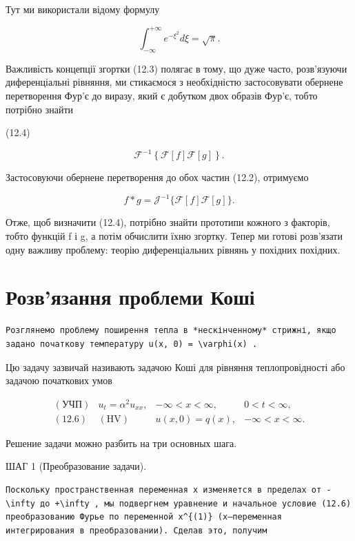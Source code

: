 \documentclass[
  ukrainian,
]{article}
\begin{document}
Тут ми використали відому формулу

\[
\int_{-\infty}^{+\infty} e^{-\xi^2} d\xi = \sqrt{\pi}.
\]

Важливість концепції згортки (12.3) полягає в тому, що дуже часто,
розв'язуючи диференціальні рівняння, ми стикаємося з необхідністю
застосовувати обернене перетворення Фур'є до виразу, який є добутком
двох образів Фур'є, тобто потрібно знайти

(12.4)

\[
\mathcal{F}^{-1}\left\{\mathcal{F}\left[f\right]\mathcal{F}\left[g\right]\right\}.
\]

Застосовуючи обернене перетворення до обох частин (12.2), отримуємо

\[
f * g = \mathcal{J}^{-1} \{ \mathcal{F} [f] \mathcal{F} [g] \}.
\]

Отже, щоб визначити (12.4), потрібно знайти прототипи кожного з
факторів, тобто функцій f і g, а потім обчислити їхню згортку. Тепер ми
готові розв'язати одну важливу проблему: теорію диференціальних рівнянь
у похідних похідних.

\section{Розв'язання проблеми
Коші}\label{ux440ux43eux437ux432ux44fux437ux430ux43dux43dux44f-ux43fux440ux43eux431ux43bux435ux43cux438-ux43aux43eux448ux456}

\begin{verbatim}
Розглянемо проблему поширення тепла в *нескінченному* стрижні, якщо задано початкову температуру u(x, 0) = \varphi(x) .
\end{verbatim}

Цю задачу зазвичай називають задачою Коші для рівняння теплопровідності
або задачою початкових умов

\[
\begin{array}{lll} (\text{УЧП}) & u_t = \alpha^2 u_{xx}, & -\infty < x < \infty, & 0 < t < \infty, \\ (\text{12.6}) & (\text{HV}) & u(x,0) = q(x), & -\infty < x < \infty. \end{array}
\]

Решение задачи можно разбить на три основных шага.

ШАГ 1 (Преобразование задачи).

\begin{verbatim}
Поскольку пространственная переменная x изменяется в пределах от -\infty до +\infty , мы подвергнем уравнение и начальное условие (12.6) преобразованию Фурье по переменной x^{(1)} (x—переменная интегрирования в преобразовании). Сделав это, получим
\end{verbatim}
\end{document}
